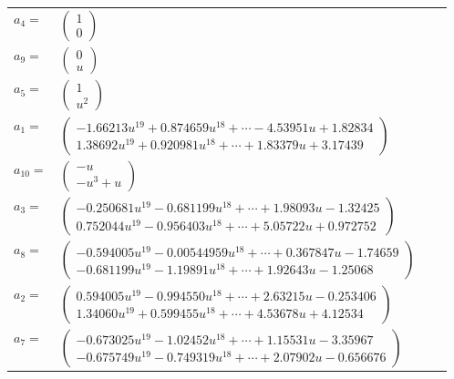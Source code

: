 \documentclass[1p]{elsarticle_modified}
\theoremstyle{definition}
\begin{document}
\begin{tabular}{m{7pt} m{180pt} m{7pt} m{180pt} }
\flushright $a_{4}=$&$\begin{pmatrix}1\\0\end{pmatrix}$ \\
\flushright $a_{9}=$&$\begin{pmatrix}0\\u\end{pmatrix}$ \\
\flushright $a_{5}=$&$\begin{pmatrix}1\\u^2\end{pmatrix}$ \\
\flushright $a_{1}=$&$\begin{pmatrix}-1.66213 u^{19}+0.874659 u^{18}+\cdots-4.53951 u+1.82834\\1.38692 u^{19}+0.920981 u^{18}+\cdots+1.83379 u+3.17439\end{pmatrix}$ \\
\flushright $a_{10}=$&$\begin{pmatrix}- u\\- u^3+u\end{pmatrix}$ \\
\flushright $a_{3}=$&$\begin{pmatrix}-0.250681 u^{19}-0.681199 u^{18}+\cdots+1.98093 u-1.32425\\0.752044 u^{19}-0.956403 u^{18}+\cdots+5.05722 u+0.972752\end{pmatrix}$ \\
\flushright $a_{8}=$&$\begin{pmatrix}-0.594005 u^{19}-0.00544959 u^{18}+\cdots+0.367847 u-1.74659\\-0.681199 u^{19}-1.19891 u^{18}+\cdots+1.92643 u-1.25068\end{pmatrix}$ \\
\flushright $a_{2}=$&$\begin{pmatrix}0.594005 u^{19}-0.994550 u^{18}+\cdots+2.63215 u-0.253406\\1.34060 u^{19}+0.599455 u^{18}+\cdots+4.53678 u+4.12534\end{pmatrix}$ \\
\flushright $a_{7}=$&$\begin{pmatrix}-0.673025 u^{19}-1.02452 u^{18}+\cdots+1.15531 u-3.35967\\-0.675749 u^{19}-0.749319 u^{18}+\cdots+2.07902 u-0.656676\end{pmatrix}$ \\

\end{tabular}
\end{document}
